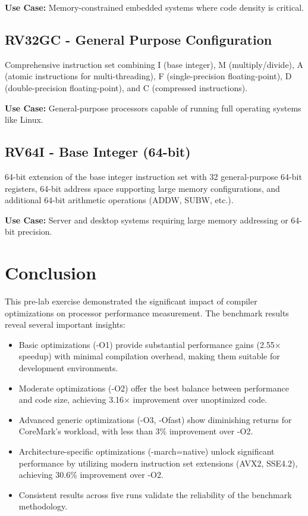 \documentclass[11pt,a4paper]{article}
\begin{document}
\textbf{Use Case:} Memory-constrained embedded systems where code density is critical.

\subsection{RV32GC - General Purpose Configuration}
Comprehensive instruction set combining I (base integer), M (multiply/divide), A (atomic instructions for multi-threading), F (single-precision floating-point), D (double-precision floating-point), and C (compressed instructions).

\textbf{Use Case:} General-purpose processors capable of running full operating systems like Linux.

\subsection{RV64I - Base Integer (64-bit)}
64-bit extension of the base integer instruction set with 32 general-purpose 64-bit registers, 64-bit address space supporting large memory configurations, and additional 64-bit arithmetic operations (ADDW, SUBW, etc.).

\textbf{Use Case:} Server and desktop systems requiring large memory addressing or 64-bit precision.

\section{Conclusion}

This pre-lab exercise demonstrated the significant impact of compiler optimizations on processor performance measurement. The benchmark results reveal several important insights:

\begin{itemize}
    \item Basic optimizations (-O1) provide substantial performance gains (2.55× speedup) with minimal compilation overhead, making them suitable for development environments.
    
    \item Moderate optimizations (-O2) offer the best balance between performance and code size, achieving 3.16× improvement over unoptimized code.
    
    \item Advanced generic optimizations (-O3, -Ofast) show diminishing returns for CoreMark's workload, with less than 3\% improvement over -O2.
    
    \item Architecture-specific optimizations (-march=native) unlock significant performance by utilizing modern instruction set extensions (AVX2, SSE4.2), achieving 30.6\% improvement over -O2.
    
    \item Consistent results across five runs validate the reliability of the benchmark methodology.
\end{itemize}
\end{document}
